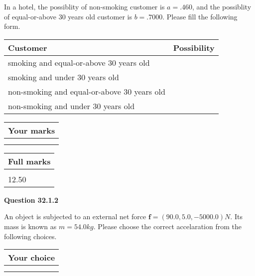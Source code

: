 \documentclass[12pt]{article}
\begin{document}
  
In a hotel, the possiblity of  %
non-smoking customer is
$a =  %
.460$, and the possiblity of  %
equal-or-above 30 years old customer is $ b =  %
.7000$.
Please fill the following form.
 
\noindent
\begin{tabular}{|l|l|}
\hline
Customer & Possibility \\
\hline
smoking  and   %
equal-or-above 30 years old  & \\
\hline
smoking  and   %
under 30 years old & \\
\hline
 non-smoking and   %
equal-or-above 30 years old  & \\
\hline
 non-smoking and  %
under 30 years old & \\
\hline
\end{tabular}
 
 
 

 

 
\vspace{0.3in}
  
\vspace{0.2in}
  
         \begin{tabular}{|l|}
\hline
 Your marks  \\
\hline
 \\ 
 \\ 
\hline
\end{tabular}
\hspace{0.05in} \begin{tabular}{|l|}
\hline
 Full marks  \\
\hline
 \\ 
12.50 \\
\hline
\end{tabular}
{\textbf{\Large{Question
32.1.2 
}}}
  
  
 
An object is subjected to an external net force $\mathbf{f}=(
90.0 ,
5.0,
-5000.0  )N$. Its mass is known as
$m= %
54.0  kg$. Please choose the correct accelaration
from the following choices.
 
  
  
\noindent\hspace{3.0in} \begin{tabular}{|l|}
\hline
Your choice \\
\hline
 \\ 
 \\ 
\hline
\end{tabular}
  
\end{document}
